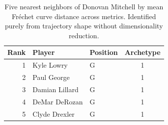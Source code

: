 \begin{table}[htbp]
  \centering\small
  \begin{tabular}{rllc}
    \toprule
    Rank & Player & Position & Archetype \\
    \midrule
    1 & Kyle Lowry & G & 1 \\
    2 & Paul George & G & 1 \\
    3 & Damian Lillard & G & 1 \\
    4 & DeMar DeRozan & G & 1 \\
    5 & Clyde Drexler & G & 1 \\
    \bottomrule
  \end{tabular}
  \caption{Five nearest neighbors of Donovan Mitchell by mean Fr\'{e}chet curve distance across metrics. Identified purely from trajectory shape without dimensionality reduction.}
  \label{tab:Donovan_Mitchell_frechet_curve_neighbors}
\end{table}

